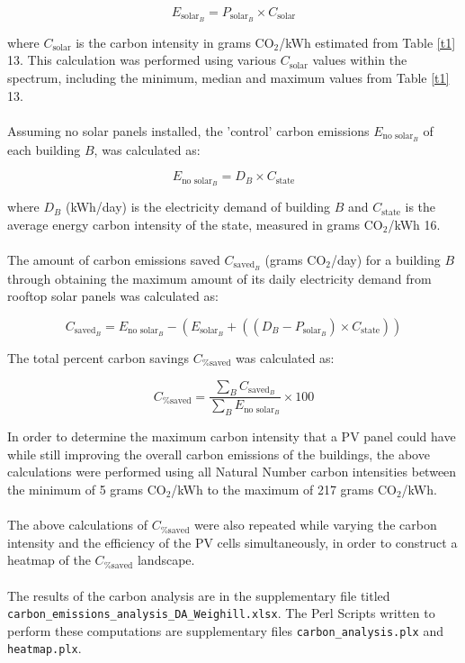 \begin{equation}
E_{{\mbox{solar}}_{B}} = P_{{\mbox{solar}}_{B}} \times C_{\mbox{solar}}
\end{equation}

\noindent where $C_{\mbox{solar}}$ is the carbon intensity in grams CO$_{2}$/kWh estimated from Table \ref{t1} \cite{debbie}{13}. This calculation was performed using various $C_{\mbox{solar}}$ values within the spectrum, including the minimum, median and maximum values from Table \ref{t1} \cite{debbie}{13}.
\\\\
\noindent Assuming no solar panels installed, the 'control' carbon emissions $E_{{\mbox{no solar}}_{B}}$ of each building $B$, was calculated as:

\begin{equation}
E_{{\mbox{no solar}}_{B}} = D_{B} \times C_{\mbox{state}}
\end{equation}

\noindent where $D_{B}$ (kWh/day) is the electricity demand of building $B$ and $C_{\mbox{state}}$ is the average energy carbon intensity of the state, measured in grams CO$_{2}$/kWh \cite{debbie}{16}.
\\\\
\noindent The amount of carbon emissions saved $C_{{\mbox{saved}}_{B}}$ (grams CO$_{2}$/day) for a building $B$ through obtaining the maximum amount of its daily electricity demand from rooftop solar panels was calculated as:

\begin{equation}
C_{{\mbox{saved}}_{B}} = E_{{\mbox{no solar}}_{B}} - \left(E_{{\mbox{solar}}_{B}} + \left( \left( D_{B} - P_{{\mbox{solar}}_{B}}\right) \times C_{\mbox{state}}\right) \right)
\end{equation}

\noindent The total percent carbon savings $C_{\mbox{\% saved}}$  was calculated as:

\begin{equation}
C_{\mbox{\% saved}} = \frac{\sum_{B}C_{{\mbox{saved}}_{B}}}{\sum_{B}E_{{\mbox{no solar}}_{B}}} \times 100
\end{equation}

\noindent In order to determine the maximum carbon intensity that a PV panel could have while still
improving the overall carbon emissions of the buildings, the above calculations were performed using all Natural Number carbon intensities between the minimum of 5 grams CO$_{2}$/kWh to the maximum of 217 grams CO$_{2}$/kWh.
\\\\
\noindent The above calculations of $C_{\mbox{\% saved}}$ were also repeated while varying the carbon intensity and the efficiency of the PV cells simultaneously, in order to construct a heatmap of the $C_{\mbox{\% saved}}$ landscape.
\\\\
\noindent 
The results of the carbon analysis are in the supplementary file titled \texttt{carbon\_emissions\_analysis\_DA\_Weighill.xlsx}. The Perl Scripts written to perform these computations are supplementary files \texttt{carbon\_analysis.plx} and \texttt{heatmap.plx}.

